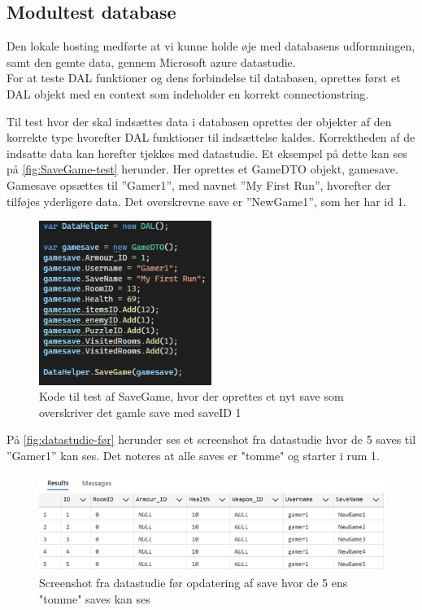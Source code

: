 \subsection{Modultest database}
\label{ssec: Modultest database}
Den lokale hosting medførte at vi kunne holde øje med databasens udformningen, samt den gemte data, gennem Microsoft azure datastudie.\\

For at teste DAL funktioner og dens forbindelse til databasen, oprettes først et DAL objekt med en context som indeholder en korrekt connectionstring.

Til test hvor der skal indsættes data i databasen oprettes der objekter af den korrekte type hvorefter DAL funktioner til indsættelse kaldes. Korrektheden af de indsatte data kan herefter tjekkes med datastudie.
Et eksempel på dette kan ses på \autoref{fig:SaveGame-test} herunder.
Her oprettes et GameDTO objekt, gamesave.\\
Gamesave opsættes til ”Gamer1”, med navnet ”My First Run”, hvorefter der tilføjes yderligere data. Det overskrevne save er ”NewGame1”, som her har id 1.

\begin{figure}[H]
\centering
\includegraphics[width = 0.5\textwidth]{02-Body/Images/DAL-Database/DB-Test.png}
\caption{Kode til test af SaveGame, hvor der oprettes et nyt save som overskriver det gamle save med saveID 1}
\label{fig:SaveGame-test}
\end{figure}

På \autoref{fig:datastudie-før} herunder ses et screenshot fra datastudie hvor de 5 saves til ”Gamer1” kan ses.
Det noteres at alle saves er "tomme" og starter i rum 1.

\begin{figure}[H]
\centering
\includegraphics[width = \textwidth]{02-Body/Images/DAL-Database/DatastudieFørIndsættelse.png}
\caption{Screenshot fra datastudie før opdatering af save hvor de 5 ens "tomme" saves kan ses}
\label{fig:datastudie-før}
\end{figure}

